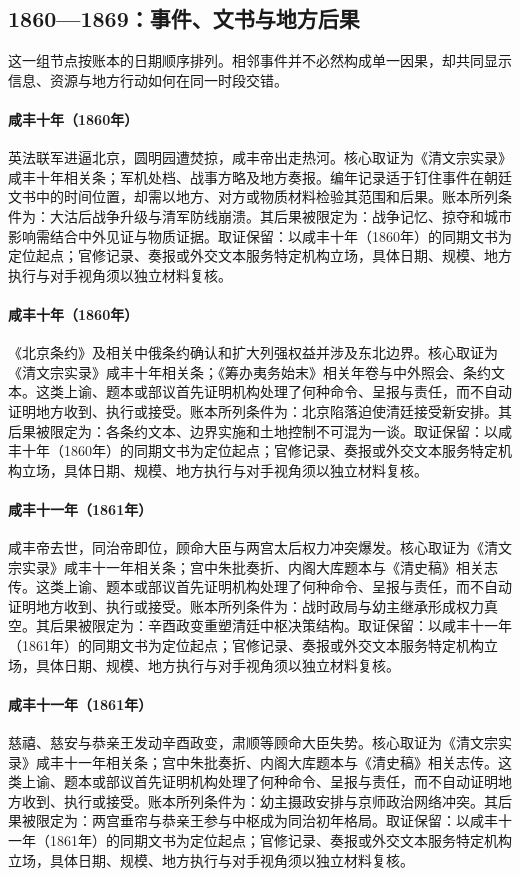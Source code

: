 \subsection{1860—1869：事件、文书与地方后果}
这一组节点按账本的日期顺序排列。相邻事件并不必然构成单一因果，却共同显示信息、资源与地方行动如何在同一时段交错。
\hypertarget{ledger:EQ-1860-BEIJING-CAMPAIGN}{}\paragraph{咸丰十年（1860年）}英法联军进逼北京，圆明园遭焚掠，咸丰帝出走热河。核心取证为《清文宗实录》咸丰十年相关条；军机处档、战事方略及地方奏报。编年记录适于钉住事件在朝廷文书中的时间位置，却需以地方、对方或物质材料检验其范围和后果。账本所列条件为：大沽后战争升级与清军防线崩溃。其后果被限定为：战争记忆、掠夺和城市影响需结合中外见证与物质证据。取证保留：以咸丰十年（1860年）的同期文书为定位起点；官修记录、奏报或外交文本服务特定机构立场，具体日期、规模、地方执行与对手视角须以独立材料复核。
\hypertarget{ledger:EQ-1860-CONVENTION-OF-PEKING}{}\paragraph{咸丰十年（1860年）}《北京条约》及相关中俄条约确认和扩大列强权益并涉及东北边界。核心取证为《清文宗实录》咸丰十年相关条；《筹办夷务始末》相关年卷与中外照会、条约文本。这类上谕、题本或部议首先证明机构处理了何种命令、呈报与责任，而不自动证明地方收到、执行或接受。账本所列条件为：北京陷落迫使清廷接受新安排。其后果被限定为：各条约文本、边界实施和土地控制不可混为一谈。取证保留：以咸丰十年（1860年）的同期文书为定位起点；官修记录、奏报或外交文本服务特定机构立场，具体日期、规模、地方执行与对手视角须以独立材料复核。
\hypertarget{ledger:EQ-1861-XIANFENG-DEATH}{}\paragraph{咸丰十一年（1861年）}咸丰帝去世，同治帝即位，顾命大臣与两宫太后权力冲突爆发。核心取证为《清文宗实录》咸丰十一年相关条；宫中朱批奏折、内阁大库题本与《清史稿》相关志传。这类上谕、题本或部议首先证明机构处理了何种命令、呈报与责任，而不自动证明地方收到、执行或接受。账本所列条件为：战时政局与幼主继承形成权力真空。其后果被限定为：辛酉政变重塑清廷中枢决策结构。取证保留：以咸丰十一年（1861年）的同期文书为定位起点；官修记录、奏报或外交文本服务特定机构立场，具体日期、规模、地方执行与对手视角须以独立材料复核。
\hypertarget{ledger:EQ-1861-XINYOU-COUP}{}\paragraph{咸丰十一年（1861年）}慈禧、慈安与恭亲王发动辛酉政变，肃顺等顾命大臣失势。核心取证为《清文宗实录》咸丰十一年相关条；宫中朱批奏折、内阁大库题本与《清史稿》相关志传。这类上谕、题本或部议首先证明机构处理了何种命令、呈报与责任，而不自动证明地方收到、执行或接受。账本所列条件为：幼主摄政安排与京师政治网络冲突。其后果被限定为：两宫垂帘与恭亲王参与中枢成为同治初年格局。取证保留：以咸丰十一年（1861年）的同期文书为定位起点；官修记录、奏报或外交文本服务特定机构立场，具体日期、规模、地方执行与对手视角须以独立材料复核。
